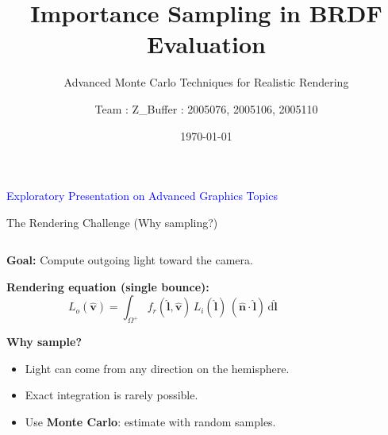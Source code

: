 \documentclass[aspectratio=169]{beamer}
\title{Importance Sampling in BRDF Evaluation}
\subtitle{Advanced Monte Carlo Techniques for Realistic Rendering}
\author{Team : Z\_Buffer : 2005076, 2005106, 2005110}
\institute{BUET CSE 409: Computer Graphics}
\date{\today}
\newcommand{\nvec}{\hat{\mathbf{n}}}
\newcommand{\lvec}{\hat{\mathbf{l}}}
\newcommand{\vvec}{\hat{\mathbf{v}}}
\newcommand{\Hemisphere}{\Omega^+}
\let\olditem\item
\renewcommand{\item}{\olditem \vspace{2pt}}
\begin{document}
\begin{frame}
  \titlepage
  \begin{center}
    \vspace{0.4cm}
    \textcolor{blue}{\large Exploratory Presentation on Advanced Graphics Topics}
  \end{center}
\end{frame}

\begin{frame}{The Rendering Challenge (Why sampling?)}
\begin{columns}
\begin{column}{0.58\textwidth}
\textbf{Goal:} Compute outgoing light toward the camera.

\medskip
\textbf{Rendering equation (single bounce):}
\[
L_o(\vvec)=\int_{\Hemisphere} f_r(\lvec,\vvec)\,L_i(\lvec)\,(\nvec\!\cdot\!\lvec)\,\mathrm{d}\lvec
\]

\textbf{Why sample?}
\begin{itemize}
  \item Light can come from any direction on the hemisphere.
  \item Exact integration is rarely possible.
  \item Use \textbf{Monte Carlo}: estimate with random samples.
\end{itemize}
\end{column}
\begin{column}{0.42\textwidth}
\end{column}
\end{columns}
\end{frame}
\end{document}
